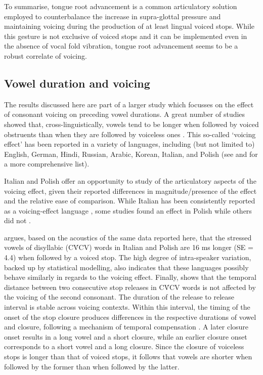 \documentclass[12pt,]{article}
\begin{document}
To summarise, tongue root advancement is a common articulatory solution
employed to counterbalance the increase in supra-glottal pressure and
maintaining voicing during the production of at least lingual voiced
stops. While this gesture is not exclusive of voiced stops and it can be
implemented even in the absence of vocal fold vibration, tongue root
advancement seems to be a robust correlate of voicing.

\hypertarget{vowel-duration-and-voicing}{%
\subsection{Vowel duration and
voicing}\label{vowel-duration-and-voicing}}

The results discussed here are part of a larger study which focusses on
the effect of consonant voicing on preceding vowel durations. A great
number of studies showed that, cross-linguistically, vowels tend to be
longer when followed by voiced obstruents than when they are followed by
voiceless ones
\citep{house1953, peterson1960, chen1970, klatt1973, lisker1974, farnetani1986, fowler1992, hussein1994, esposito2002, lampp2004, durvasula2012}.
This so-called `voicing effect' has been reported in a variety of
languages, including (but not limited to) English, German, Hindi,
Russian, Arabic, Korean, Italian, and Polish (see
\citealt{maddieson1976} and \citealt{begus2017} for a more comprehensive
list).

Italian and Polish offer an opportunity to study of the articulatory
aspects of the voicing effect, given their reported differences in
magnitude/presence of the effect and the relative ease of comparison.
While Italian has been consistently reported as a voicing-effect
language \citep{caldognetto1979, farnetani1986, esposito2002}, some
studies found an effect in Polish
\citep{slowiaczek1985, nowak2006, malisz2008, coretta2018j} while others
did not \citep{keating1984, jassem1989}.

\citet{coretta2018j} argues, based on the acoustics of the same data
reported here, that the stressed vowels of disyllabic (CV́CV) words in
Italian and Polish are 16 ms longer (SE = 4.4) when followed by a voiced
stop. The high degree of intra-speaker variation, backed up by
statistical modelling, also indicates that these languages possibly
behave similarly in regards to the voicing effect. Finally,
\citet{coretta2018j} shows that the temporal distance between two
consecutive stop releases in CV́CV words is not affected by the voicing
of the second consonant. The duration of the release to release interval
is stable across voicing contexts. Within this interval, the timing of
the onset of the stop closure produces differences in the respective
durations of vowel and closure, following a mechanism of temporal
compensation
\citep{lindblom1967, slis1969a, slis1969, lehiste1970, lehiste1970a}. A
later closure onset results in a long vowel and a short closure, while
an earlier closure onset corresponds to a short vowel and a long
closure. Since the closure of voiceless stops is longer than that of
voiced stops, it follows that vowels are shorter when followed by the
former than when followed by the latter.
\end{document}
